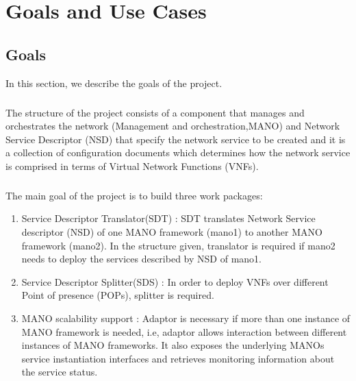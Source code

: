 \chapter{Goals and Use Cases}
\label{ch:Goals and Use Cases}


\section{Goals}
In this section, we describe the goals of the project.






\paragraph{}
The structure of the project consists of a component that manages and orchestrates the network (Management and orchestration,MANO) and Network Service Descriptor (NSD) that specify the network service to be created and it is a collection of configuration documents which determines how the network service is comprised in terms of Virtual Network Functions (VNFs).
 



\paragraph{}
The main goal of the project is to build three work packages:

\begin{enumerate}
	\item Service Descriptor Translator(SDT) : SDT  translates Network Service descriptor (NSD) of one MANO framework (mano1) to another MANO framework (mano2). In the structure given, translator is required if  mano2 needs to deploy the services described by NSD of mano1.
	\item Service Descriptor Splitter(SDS) : In order to deploy VNFs over different Point of presence (POPs), splitter is required.
	\item MANO scalability support : Adaptor is necessary if more than one instance of MANO framework is needed, i.e,  adaptor allows interaction between different instances of MANO frameworks. It also exposes the underlying MANOs service instantiation interfaces and retrieves monitoring information about the service status.
\end{enumerate}

